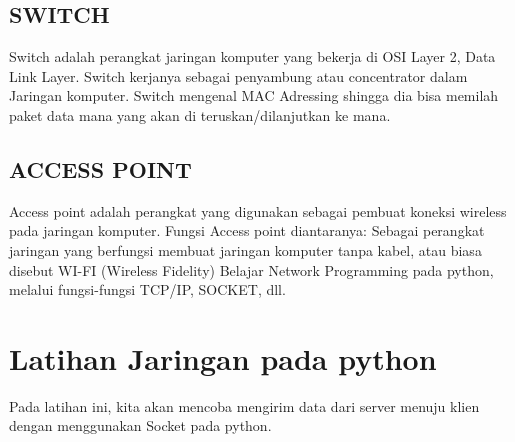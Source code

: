   \subsection{SWITCH}
    Switch adalah perangkat jaringan komputer yang bekerja di OSI Layer 2, Data Link Layer. Switch kerjanya sebagai penyambung atau concentrator dalam Jaringan komputer. Switch mengenal MAC Adressing shingga dia bisa memilah paket data mana yang akan di teruskan/dilanjutkan ke mana.
\subsection{ACCESS POINT}
    Access point adalah perangkat yang digunakan sebagai pembuat koneksi wireless pada jaringan komputer. Fungsi Access point diantaranya: Sebagai perangkat jaringan yang berfungsi membuat jaringan komputer tanpa kabel, atau biasa disebut WI-FI (Wireless Fidelity)
  Belajar Network Programming pada python, melalui fungsi-fungsi TCP/IP, SOCKET, dll.

\section{Latihan Jaringan pada python}
Pada latihan ini, kita akan mencoba mengirim data dari server menuju klien dengan menggunakan Socket pada python.
